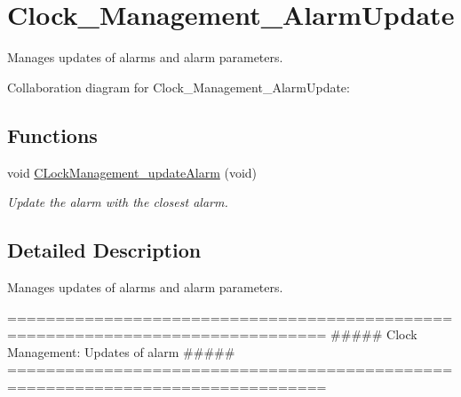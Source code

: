 \hypertarget{group___clock___management___alarm_update}{}\section{Clock\+\_\+\+Management\+\_\+\+Alarm\+Update}
\label{group___clock___management___alarm_update}


Manages updates of alarms and alarm parameters.  


Collaboration diagram for Clock\+\_\+\+Management\+\_\+\+Alarm\+Update\+:
\subsection*{Functions}
\begin{DoxyCompactItemize}
\item 
\mbox{\label{group___clock___management___alarm_update_gab3193e7c0f26b76a48829295caf4888f}} 
void \hyperlink{group___clock___management___alarm_update_gab3193e7c0f26b76a48829295caf4888f}{C\+Lock\+Management\+\_\+update\+Alarm} (void)
\begin{DoxyCompactList}\small\item\em Update the alarm with the closest alarm. \end{DoxyCompactList}\end{DoxyCompactItemize}


\subsection{Detailed Description}
Manages updates of alarms and alarm parameters. 

\begin{DoxyVerb}===============================================================================
            ##### Clock Management: Updates of alarm  #####
===============================================================================
\end{DoxyVerb}
 